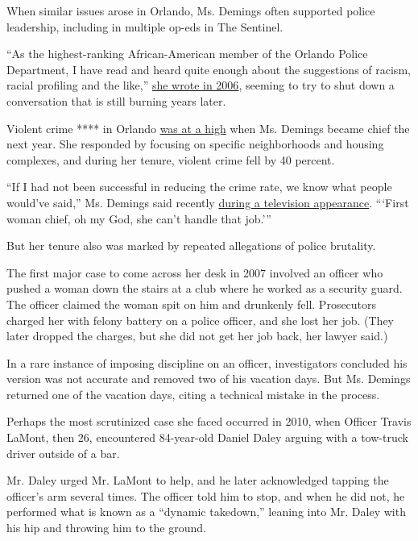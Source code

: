 When similar issues arose in Orlando, Ms. Demings often supported police
leadership, including in multiple op-eds in The Sentinel.

``As the highest-ranking African-American member of the Orlando Police
Department, I have read and heard quite enough about the suggestions of
racism, racial profiling and the like,''
\href{https://www.orlandosentinel.com/news/os-xpm-2006-06-23-myword23a-story.html}{she
wrote in 2006}, seeming to try to shut down a conversation that is still
burning years later.

Violent crime **** in Orlando
\href{https://www.nytimes3xbfgragh.onion/2006/07/23/us/orlando-joins-list-of-cities-with-sharp-increase-in-murders.html}{was
at a high} when Ms. Demings became chief the next year. She responded by
focusing on specific neighborhoods and housing complexes, and during her
tenure, violent crime fell by 40 percent.

``If I had not been successful in reducing the crime rate, we know what
people would've said,'' Ms. Demings said recently
\href{https://www.youtube.com/watch?v=fEOUF9vUdRs}{during a television
appearance}. ```First woman chief, oh my God, she can't handle that
job.'''

But her tenure also was marked by repeated allegations of police
brutality.

The first major case to come across her desk in 2007 involved an officer
who pushed a woman down the stairs at a club where he worked as a
security guard. The officer claimed the woman spit on him and drunkenly
fell. Prosecutors charged her with felony battery on a police officer,
and she lost her job. (They later dropped the charges, but she did not
get her job back, her lawyer said.)

In a rare instance of imposing discipline on an officer, investigators
concluded his version was not accurate and removed two of his vacation
days. But Ms. Demings returned one of the vacation days, citing a
technical mistake in the process.

Perhaps the most scrutinized case she faced occurred in 2010, when
Officer Travis LaMont, then 26, encountered 84-year-old Daniel Daley
arguing with a tow-truck driver outside of a bar.

Mr. Daley urged Mr. LaMont to help, and he later acknowledged tapping
the officer's arm several times. The officer told him to stop, and when
he did not, he performed what is known as a ``dynamic takedown,''
leaning into Mr. Daley with his hip and throwing him to the ground.

